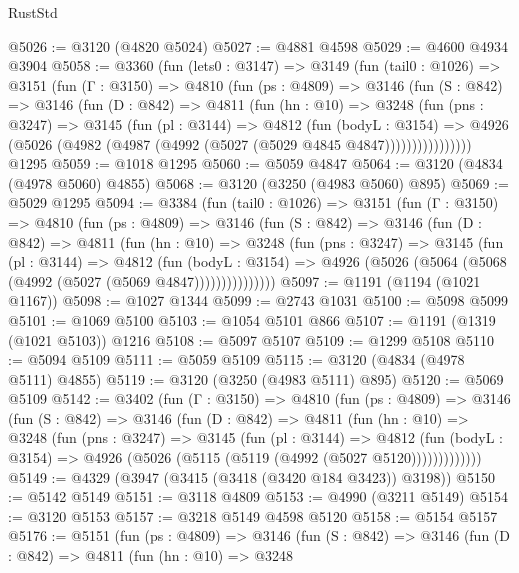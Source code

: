 \begin{lexlean}{RustStd}
\begin{coremodule}
@5026 := @3120 (@4820 @5024)
@5027 := @4881 @4598
@5029 := @4600 @4934 @3904
@5058 := @3360
    (fun (lets0 : @3147) =>
    @3149
      (fun (tail0 : @1026) =>
      @3151
        (fun (Γ : @3150) =>
        @4810
          (fun (ps : @4809) =>
          @3146
            (fun (S : @842) =>
            @3146
              (fun (D : @842) =>
              @4811
                (fun (hn : @10) =>
                @3248
                  (fun (pns : @3247) =>
                  @3145
                    (fun (pl : @3144) =>
                    @4812
                      (fun (bodyL : @3154) =>
                      @4926 (@5026 (@4982 (@4987 (@4992 (@5027 (@5029 @4845 @4847))))))))))))))))
    @1295
@5059 := @1018 @1295
@5060 := @5059 @4847
@5064 := @3120 (@4834 (@4978 @5060) @4855)
@5068 := @3120 (@3250 (@4983 @5060) @895)
@5069 := @5029 @1295
@5094 := @3384
    (fun (tail0 : @1026) =>
    @3151
      (fun (Γ : @3150) =>
      @4810
        (fun (ps : @4809) =>
        @3146
          (fun (S : @842) =>
          @3146
            (fun (D : @842) =>
            @4811
              (fun (hn : @10) =>
              @3248
                (fun (pns : @3247) =>
                @3145
                  (fun (pl : @3144) =>
                  @4812
                    (fun (bodyL : @3154) =>
                    @4926 (@5026 (@5064 (@5068 (@4992 (@5027 (@5069 @4847)))))))))))))))
@5097 := @1191 (@1194 (@1021 @1167))
@5098 := @1027 @1344
@5099 := @2743 @1031
@5100 := @5098 @5099
@5101 := @1069 @5100
@5103 := @1054 @5101 @866
@5107 := @1191 (@1319 (@1021 @5103)) @1216
@5108 := @5097 @5107
@5109 := @1299 @5108
@5110 := @5094 @5109
@5111 := @5059 @5109
@5115 := @3120 (@4834 (@4978 @5111) @4855)
@5119 := @3120 (@3250 (@4983 @5111) @895)
@5120 := @5069 @5109
@5142 := @3402
    (fun (Γ : @3150) =>
    @4810
      (fun (ps : @4809) =>
      @3146
        (fun (S : @842) =>
        @3146
          (fun (D : @842) =>
          @4811
            (fun (hn : @10) =>
            @3248
              (fun (pns : @3247) =>
              @3145
                (fun (pl : @3144) =>
                @4812
                  (fun (bodyL : @3154) =>
                  @4926 (@5026 (@5115 (@5119 (@4992 (@5027 @5120)))))))))))))
@5149 := @4329 (@3947 (@3415 (@3418 (@3420 @184 @3423)) @3198))
@5150 := @5142 @5149
@5151 := @3118 @4809
@5153 := @4990 (@3211 @5149)
@5154 := @3120 @5153
@5157 := @3218 @5149 @4598 @5120
@5158 := @5154 @5157
@5176 := @5151
    (fun (ps : @4809) =>
    @3146
      (fun (S : @842) =>
      @3146
        (fun (D : @842) =>
        @4811
          (fun (hn : @10) =>
          @3248

\end{coremodule}
\end{lexlean}
